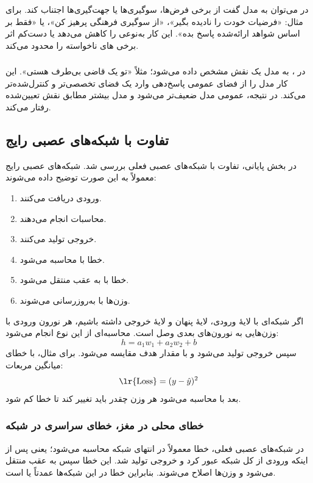 \subsubsection{}
در  می‌توان به مدل گفت از برخی فرض‌ها، سوگیری‌ها یا جهت‌گیری‌ها اجتناب کند. برای مثال: «فرضیات خودت را نادیده بگیر»، «از سوگیری فرهنگی پرهیز کن»، یا «فقط بر اساس شواهد ارائه‌شده پاسخ بده». این کار به‌نوعی  را کاهش می‌دهد یا دست‌کم اثر برخی های ناخواسته را محدود می‌کند.

\subsubsection{}
در ، به مدل یک نقش مشخص داده می‌شود؛ مثلاً «تو یک قاضی بی‌طرف هستی». این کار مدل را از فضای عمومی پاسخ‌دهی وارد یک فضای تخصصی‌تر و کنترل‌شده‌تر می‌کند. در نتیجه،  عمومی مدل ضعیف‌تر می‌شود و مدل بیشتر مطابق نقش تعیین‌شده رفتار می‌کند.

\subsection{تفاوت  با شبکه‌های عصبی رایج}
در بخش پایانی، تفاوت  با شبکه‌های عصبی فعلی بررسی شد. شبکه‌های عصبی رایج معمولاً به این صورت توضیح داده می‌شوند:
\begin{enumerate}
  \item ورودی دریافت می‌کنند.
  \item محاسبات  انجام می‌دهند.
  \item خروجی تولید می‌کنند.
  \item خطا با  محاسبه می‌شود.
  \item خطا با  به عقب منتقل می‌شود.
  \item وزن‌ها با  به‌روزرسانی می‌شوند.
\end{enumerate}

اگر شبکه‌ای با لایهٔ ورودی، لایهٔ پنهان و لایهٔ خروجی داشته باشیم، هر نورون ورودی با وزن‌هایی به نورون‌های بعدی وصل است. محاسبه‌ای از این نوع انجام می‌شود:
\[
h=a_1w_1+a_2w_2+b
\]
سپس خروجی تولید می‌شود و با مقدار هدف مقایسه می‌شود. برای مثال، با خطای میانگین مربعات:
\[
\text{\lr{Loss}}=(y-\hat{y})^2
\]
بعد با  محاسبه می‌شود هر وزن چقدر باید تغییر کند تا خطا کم شود.

\subsubsection{خطای محلی در مغز، خطای سراسری در شبکه}
در شبکه‌های عصبی فعلی، خطا معمولاً در انتهای شبکه محاسبه می‌شود؛ یعنی پس از اینکه ورودی از کل شبکه عبور کرد و خروجی تولید شد. این خطا سپس به عقب منتقل می‌شود و وزن‌ها اصلاح می‌شوند. بنابراین خطا در این شبکه‌ها عمدتاً  یا  است.

